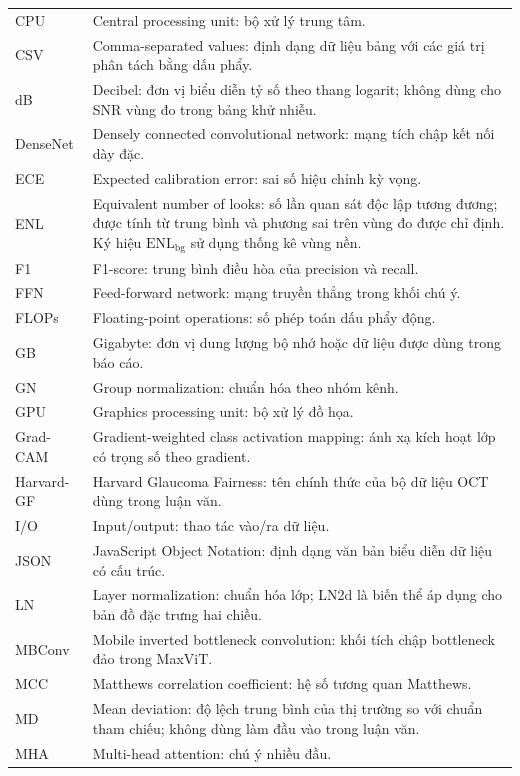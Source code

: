 \documentclass[14pt,a4paper,oneside]{extreport}
\begin{document}
\begin{longtable}{@{}>{\raggedright\arraybackslash}p{}>{\raggedright\arraybackslash}p{}@{}}
  CPU & Central processing unit: bộ xử lý trung tâm.\\
  CSV & Comma-separated values: định dạng dữ liệu bảng với các giá trị phân tách bằng dấu phẩy.\\
  dB & Decibel: đơn vị biểu diễn tỷ số theo thang logarit; không dùng cho SNR vùng đo trong bảng khử nhiễu.\\
  DenseNet & Densely connected convolutional network: mạng tích chập kết nối dày đặc.\\
  ECE & Expected calibration error: sai số hiệu chỉnh kỳ vọng.\\
  ENL & Equivalent number of looks: số lần quan sát độc lập tương đương; được tính từ trung bình và phương sai trên vùng đo được chỉ định. Ký hiệu \(\mathrm{ENL}_{\mathrm{bg}}\) sử dụng thống kê vùng nền.\\
  F1 & F1-score: trung bình điều hòa của precision và recall.\\
  FFN & Feed-forward network: mạng truyền thẳng trong khối chú ý.\\
  FLOPs & Floating-point operations: số phép toán dấu phẩy động.\\
  GB & Gigabyte: đơn vị dung lượng bộ nhớ hoặc dữ liệu được dùng trong báo cáo.\\
  GN & Group normalization: chuẩn hóa theo nhóm kênh.\\
  GPU & Graphics processing unit: bộ xử lý đồ họa.\\
  Grad-CAM & Gradient-weighted class activation mapping: ánh xạ kích hoạt lớp có trọng số theo gradient.\\
  Harvard-GF & Harvard Glaucoma Fairness: tên chính thức của bộ dữ liệu OCT dùng trong luận văn.\\
  I/O & Input/output: thao tác vào/ra dữ liệu.\\
  JSON & JavaScript Object Notation: định dạng văn bản biểu diễn dữ liệu có cấu trúc.\\
  LN & Layer normalization: chuẩn hóa lớp; LN2d là biến thể áp dụng cho bản đồ đặc trưng hai chiều.\\
  MBConv & Mobile inverted bottleneck convolution: khối tích chập bottleneck đảo trong MaxViT.\\
  MCC & Matthews correlation coefficient: hệ số tương quan Matthews.\\
  MD & Mean deviation: độ lệch trung bình của thị trường so với chuẩn tham chiếu; không dùng làm đầu vào trong luận văn.\\
  MHA & Multi-head attention: chú ý nhiều đầu.\\

\end{longtable}
\end{document}
